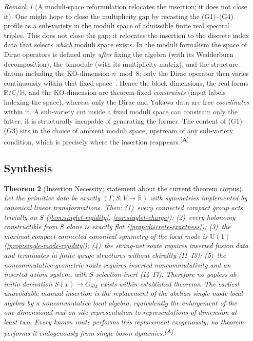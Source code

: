 \documentclass[12pt,a4paper,twoside]{article}
\theoremstyle{plain}
\newtheorem{theorem}{Theorem}[section]
\theoremstyle{definition}
\theoremstyle{remark}
\newtheorem{remark}[theorem]{Remark}
\newcommand{\catmark}[1]{\textsuperscript{\textsf{\textbf{[#1]}}}}
\begin{document}
\begin{remark}[A moduli-space reformulation relocates the insertion; it
does not close it]
\label{rem:moduli-relocation}
One might hope to close the multiplicity gap by recasting the
(G1)--(G4) profile as a sub-variety in the moduli space of admissible
finite real spectral triples. This does not close the gap; it relocates
the insertion to the discrete index data that selects \emph{which} moduli
space exists. In the moduli formalism the space of Dirac operators is
defined only \emph{after} fixing the algebra (with its Wedderburn
decomposition), the bimodule (with its multiplicity matrix), and the
structure datum including the KO-dimension $n \bmod 8$; only the Dirac
operator then varies continuously within that fixed
space~\cite{cacic2011}. Hence the block dimensions, the real forms
$\mathbb{R}/\mathbb{C}/\mathbb{H}$, and the KO-dimension are theorem-fixed
\emph{constraints} (input labels indexing the space), whereas only the
Dirac and Yukawa data are free \emph{coordinates} within it. A sub-variety
cut inside a fixed moduli space can constrain only the latter; it is
structurally incapable of generating the former. The content of
(G1)--(G3) sits in the choice of ambient moduli space, upstream of any
sub-variety condition, which is precisely where the insertion
reappears.\catmark{A}
\end{remark}

\subsection{Synthesis}
\label{app:synthesis}

\begin{theorem}[Insertion Necessity; statement about the current theorem corpus]
\label{thm:insertion-necessity}
Let the primitive data be exactly $(\Gamma,S:V\to\mathbb{R})$ with
symmetries implemented by canonical linear transformations. Then:
(1)~every connected compact group acts trivially on $S$
(\cref{lem:singlet-rigidity}, \cref{cor:singlet-charge});
(2)~every holonomy constructible from $S$ alone is exactly flat
(\cref{prop:discrete-exactness});
(3)~the maximal compact connected canonical symmetry of the local mode is
$\mathrm{U}(1)$ (\cref{prop:single-mode-rigidity});
(4)~the string-net route requires inserted fusion data and terminates in
finite gauge structures without chirality (I1--I3);
(5)~the noncommutative-geometric route requires inserted noncommutativity
and an inserted axiom system, with $S$ selection-inert (I4--I7).
Therefore no gapless ab initio derivation $S(x)\to G_{\mathrm{SM}}$ exists
within established theorems. The earliest unavoidable manual insertion is
the replacement of the abelian single-mode local algebra by a noncommutative
local algebra, equivalently the enlargement of the one-dimensional real
on-site representation to representations of dimension at least two. Every
known route performs this replacement exogenously; no theorem performs it
endogenously from single-boson dynamics.\catmark{A}
\end{theorem}
\end{document}
